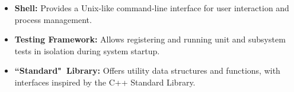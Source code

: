 \begin{itemize}[left=0em]
    \item \textbf{Shell:} Provides a Unix-like command-line interface for user interaction and
        process management.

    \item \textbf{Testing Framework:} Allows registering and running unit and subsystem tests in
        isolation during system startup.

    \item \textbf{``Standard"\footnotemark\ Library:} Offers utility data structures and
        functions, with interfaces inspired by the C++ Standard Library.
\end{itemize}

